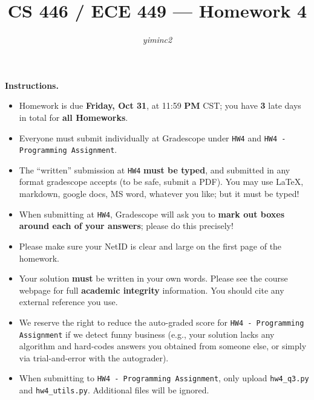 \documentclass{article}
\title{CS 446 / ECE 449 --- Homework 4}
\author{\emph{yiminc2}}
\date{}
\theoremstyle{definition}
\theoremstyle{remark}
\def\hw{HW4}
\def\hwcode{HW4 - Programming Assignment}
\begin{document}
\maketitle

\noindent\textbf{Instructions.}
\begin{itemize}
	\item
	      Homework is due \textbf{Friday, Oct 31}, at 11:59 \textbf{PM} CST; you have \textbf{3} late days in total for \textbf{all Homeworks}.

	\item
	      Everyone must submit individually at Gradescope under \texttt{\hw} and \texttt{\hwcode}.

	\item
	      The ``written'' submission at \texttt{\hw} \textbf{must be typed}, and submitted in any format gradescope accepts (to be safe, submit a PDF).  You may use \LaTeX, markdown, google docs, MS word, whatever you like; but it must be typed!

	\item
	      When submitting at \texttt{\hw}, Gradescope will ask you to \textbf{mark out boxes around each of your answers}; please do this precisely!

	\item
	      Please make sure your NetID is clear and large on the first page of the homework.

	\item
	      Your solution \textbf{must} be written in your own words.
	      Please see the course webpage for full \textbf{academic integrity} information.
	      You should cite any external reference you use.

	\item
	      We reserve the right to reduce the auto-graded score for
	      \texttt{\hwcode} if we detect funny business (e.g., your solution
	      lacks any algorithm and hard-codes answers you obtained from
	      someone else, or simply via trial-and-error with the autograder).

	\item
	      When submitting to \texttt{\hwcode}, only upload \texttt{hw4\_q3.py} and \texttt{hw4\_utils.py}. Additional files will be ignored.

\end{itemize}
\end{document}
